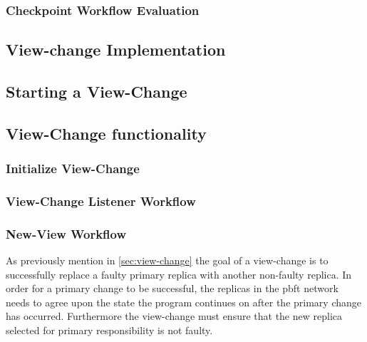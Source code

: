 \subsubsection{Checkpoint Workflow Evaluation}


\iffalse
\subsection{View-change Implementation}
\subsection{Starting a View-Change}
\subsection{View-Change functionality}
\subsubsection{Initialize View-Change}
\subsubsection{View-Change Listener Workflow}
\subsubsection{New-View Workflow}

As previously mention in \autoref{sec:view-change} the goal of a view-change is to successfully replace a faulty primary replica with another non-faulty replica. In order for a primary change to be successful, the replicas in the \ac{pbft} network needs to agree upon the state the program continues on after the primary change has occurred. Furthermore the view-change must ensure that the new replica selected for primary responsibility is not faulty. 

